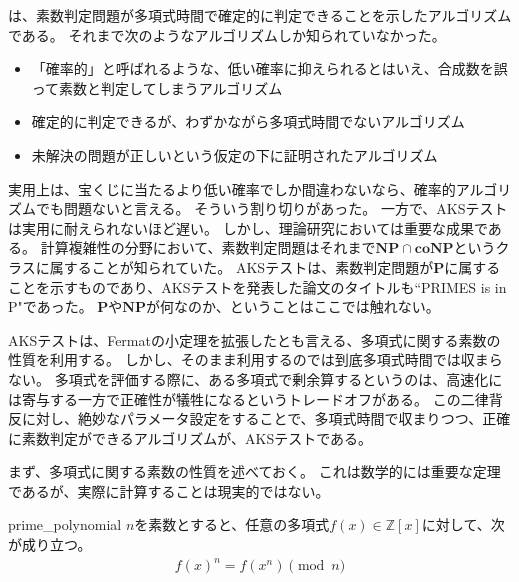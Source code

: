 は、素数判定問題が多項式時間で確定的に判定できることを示したアルゴリズムである。
それまで次のようなアルゴリズムしか知られていなかった。
\begin{itemize}
\item 「確率的」と呼ばれるような、低い確率に抑えられるとはいえ、合成数を誤って素数と判定してしまうアルゴリズム
\item 確定的に判定できるが、わずかながら多項式時間でないアルゴリズム
\item 未解決の問題が正しいという仮定の下に証明されたアルゴリズム
\end{itemize}

実用上は、宝くじに当たるより低い確率でしか間違わないなら、確率的アルゴリズムでも問題ないと言える。
そういう割り切りがあった。
一方で、AKSテストは実用に耐えられないほど遅い。
しかし、理論研究においては重要な成果である。
計算複雑性の分野において、素数判定問題はそれまで$\mathbf{NP}\cap\mathbf{coNP}$というクラスに属することが知られていた。
AKSテストは、素数判定問題が$\mathbf{P}$に属することを示すものであり、AKSテストを発表した論文のタイトルも``PRIMES is in P"であった\cite{Agrawal02primesis}。
$\mathbf{P}$や$\mathbf{NP}$が何なのか、ということはここでは触れない。

AKSテストは、Fermatの小定理を拡張したとも言える、多項式に関する素数の性質を利用する。
しかし、そのまま利用するのでは到底多項式時間では収まらない。
多項式を評価する際に、ある多項式で剰余算するというのは、高速化には寄与する一方で正確性が犠牲になるというトレードオフがある。
この二律背反に対し、絶妙なパラメータ設定をすることで、多項式時間で収まりつつ、正確に素数判定ができるアルゴリズムが、AKSテストである。

まず、多項式に関する素数の性質を述べておく。
これは数学的には重要な定理であるが、実際に計算することは現実的ではない。

\begin{Theo}{}{prime_polynomial}
$n$を素数とすると、任意の多項式$f(x)\in\mathbb{Z}[x]$に対して、次が成り立つ。
\begin{align*}
f(x)^n = f(x^n) \pmod{n}
\end{align*}
\end{Theo}

